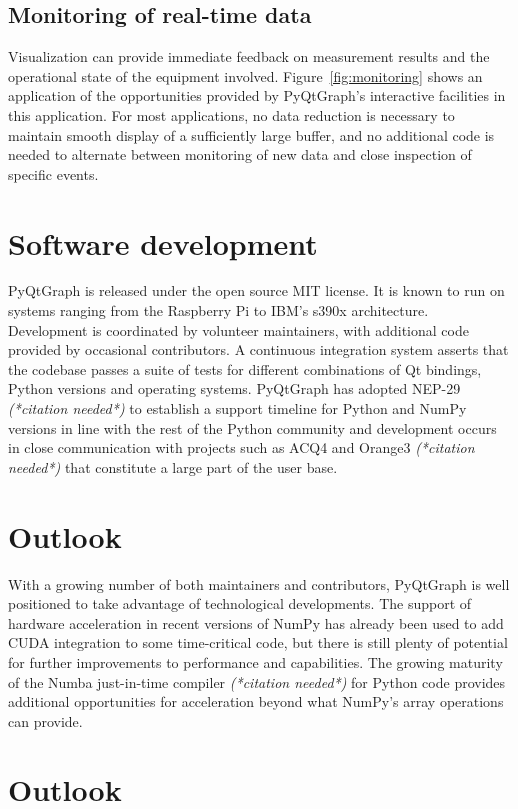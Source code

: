 \documentclass[journal]{vgtc}                %
\begin{document}
\color{DarkOrchid}
\subsection{Monitoring of real-time data}
\makeMonitoringFig
Visualization can provide immediate feedback on measurement results and the operational state of the equipment involved. Figure~\ref{fig:monitoring} shows an application of the opportunities provided by PyQtGraph's interactive facilities in this application. For most applications, no data reduction is necessary to maintain smooth display of a sufficiently large buffer, and no additional code is needed to alternate between monitoring of new data and close inspection of specific events.
\color{black}

\color{DarkOrchid}
\section{Software development}
PyQtGraph is released under the open source MIT license. It is known to run on systems ranging from the Raspberry Pi to IBM's s390x architecture. Development is coordinated by volunteer maintainers, with additional code provided by occasional contributors. A continuous integration system asserts that the codebase passes a suite of tests for different combinations of Qt bindings, Python versions and operating systems. PyQtGraph has adopted NEP-29 \emph{(*citation needed*)} to establish a support timeline for Python and NumPy versions in line with the rest of the Python community and development occurs in close communication with projects such as ACQ4 and Orange3 \emph{(*citation needed*)} that constitute a large part of the user base.

\section{Outlook}
With a growing number of both maintainers and contributors, PyQtGraph is well positioned to take advantage of technological developments. The support of hardware acceleration in recent versions of NumPy has already been used to add CUDA integration to some time-critical code, but there is still plenty of potential for further improvements to performance and capabilities. The growing maturity of the Numba just-in-time compiler \emph{(*citation needed*)} for Python code provides additional opportunities for acceleration beyond what NumPy's array operations can provide.

\color{brown}
\section{Outlook}
\end{document}
